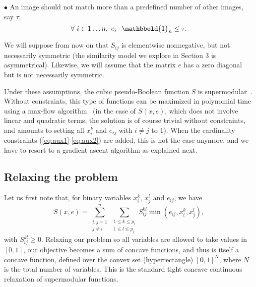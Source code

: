 \documentclass[10pt,twocolumn,letterpaper]{article}
\numberwithin{theorem}{section}
\begin{document}
\noindent$\bullet$ An image should not match more than a predefined
number of other images, say $\tau$,
\begin{equation}
\forall\,\, i\in 1\ldots n,\,\,e_i\cdot\mathbbold{1}_n\le \tau.
\label{eq:aux2}
\end{equation}

 We will suppose from now on that $S_{ij}$
is elementwise nonnegative, but not necessarily symmetric (the similarity model we explore in Section 3 is asymmetrical). Likewise,
we will assume that the matrix $e$ has a zero diagonal but is not
necessarily symmetric.



Under these assumptions, the cubic pseudo-Boolean function $S$ is
supermodular~\cite{BoHa02}.  Without constraints, this type of
functions can be maximized in polynomial time using a max-flow
algorithm~\cite{BiMi85} (in the case of $S(x,e)$, which does not
involve linear and quadratic terms, the solution is of course trivial
without constraints, and amounts to setting all $x_i^k$ and $e_{ij}$ with $i \neq j$ to 1).  When
the cardinality constraints (\ref{eq:aux1}-\ref{eq:aux2}) are
added, this is not the case anymore, and we have to resort to a
gradient ascent algorithm as explained next.





\subsection{Relaxing the problem}
\label{sec:optimization}
Let us first note that, for
binary variables $x_i^k$, $x_j^l$ and $e_{ij}$, we have
\begin{equation}
\label{eq:cont_main}
S(x,e)=\sum_{\substack{i,j=1\\j\neq i}}^n\sum_{\substack{1\le k\le p_i\\ 1\le l\le p_j}}
S_{ij}^{kl} \min (e_{ij}, 
x_i^k, x_j^l),
\end{equation}
with $S_{ij}^{kl}\ge 0$. Relaxing our problem so all variables are
allowed to take values in $[0,1]$, our objective becomes a sum of
concave functions, and thus is itself a concave function, defined over
the convex set (hyperrectangle) $[0,1]^N$, where $N$ is the total
number of variables. This is the standard tight
concave continuous relaxation of supermodular functions.
\end{document}
